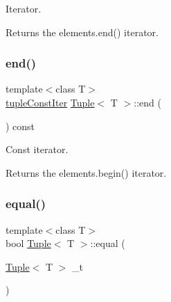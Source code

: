 Iterator. 

\begin{DoxyReturn}{Returns}
the elements.\+end() iterator. 
\end{DoxyReturn}
\mbox{\label{class_tuple_ac55a72437773f17dd8fbccf866d7e7eb}} 
\subsubsection{\texorpdfstring{end()}{end()}\hspace{0.1cm}{\footnotesize\ttfamily [2/2]}}
{\footnotesize\ttfamily template$<$class T$>$ \\
\mbox{\hyperlink{maths_8hh_a2eba794860251c1b30e532df32ee4d1b}{tuple\+Const\+Iter}} \mbox{\hyperlink{class_tuple}{Tuple}}$<$ T $>$\+::end (\begin{DoxyParamCaption}{ }\end{DoxyParamCaption}) const\hspace{0.3cm}{\ttfamily [inline]}}



Const iterator. 

\begin{DoxyReturn}{Returns}
the elements.\+begin() iterator. 
\end{DoxyReturn}
\mbox{\label{class_tuple_a68d1d3aaecc187f8f78b46f4e1b48260}} 
\subsubsection{\texorpdfstring{equal()}{equal()}}
{\footnotesize\ttfamily template$<$class T$>$ \\
bool \mbox{\hyperlink{class_tuple}{Tuple}}$<$ T $>$\+::equal (\begin{DoxyParamCaption}\item[{\mbox{\hyperlink{class_tuple}{Tuple}}$<$ T $>$}]{\+\_\+t }\end{DoxyParamCaption})\hspace{0.3cm}{\ttfamily [inline]}}

\mbox{\label{class_tuple_ae36c533bd6e97ac45a2ed69a0c4760e4}} 
